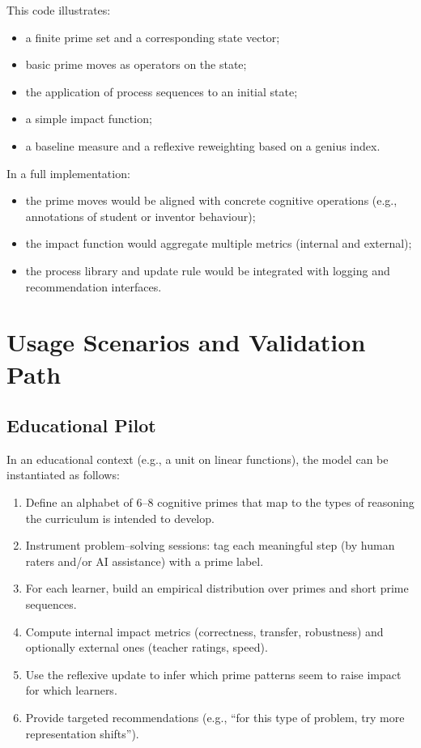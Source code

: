 \documentclass[11pt]{article}
\begin{document}
This code illustrates:
\begin{itemize}[nosep]
  \item a finite prime set and a corresponding state vector;
  \item basic prime moves as operators on the state;
  \item the application of process sequences to an initial state;
  \item a simple impact function;
  \item a baseline measure and a reflexive reweighting based on a genius index.
\end{itemize}

In a full implementation:
\begin{itemize}[nosep]
  \item the prime moves would be aligned with concrete cognitive operations (e.g., annotations of student or inventor behaviour);
  \item the impact function would aggregate multiple metrics (internal and external);
  \item the process library and update rule would be integrated with logging and recommendation interfaces.
\end{itemize}

\section{Usage Scenarios and Validation Path}

\subsection{Educational Pilot}

In an educational context (e.g., a unit on linear functions), the model can be instantiated as follows:
\begin{enumerate}[nosep]
  \item Define an alphabet of 6--8 cognitive primes that map to the types of reasoning the curriculum is intended to develop.
  \item Instrument problem--solving sessions: tag each meaningful step (by human raters and/or AI assistance) with a prime label.
  \item For each learner, build an empirical distribution over primes and short prime sequences.
  \item Compute internal impact metrics (correctness, transfer, robustness) and optionally external ones (teacher ratings, speed).
  \item Use the reflexive update to infer which prime patterns seem to raise impact for which learners.
  \item Provide targeted recommendations (e.g., ``for this type of problem, try more representation shifts'').
\end{enumerate}
\end{document}
